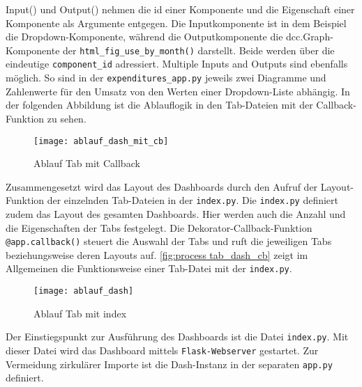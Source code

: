     Input() und Output() nehmen die id einer Komponente und die Eigenschaft einer Komponente als Argumente entgegen.
    Die Inputkomponente ist in dem Beispiel die Dropdown-Komponente, während die Outputkomponente die dcc.Graph-Komponente der
    \texttt{html\_fig\_use\_by\_month()} darstellt. Beide werden über die eindeutige \texttt{component\_id} adressiert.
    Multiple Inputs and Outputs sind ebenfalls möglich. So sind in der \texttt{expenditures\_app.py}
    jeweils zwei Diagramme und Zahlenwerte für den Umsatz von den Werten einer Dropdown-Liste abhängig.
    In der folgenden Abbildung ist die Ablauflogik in den Tab-Dateien mit der Callback-Funktion zu sehen.

    \begin{figure}[H]
        \centering
            \texttt{[image: ablauf\_dash\_mit\_cb]}
            \caption{Ablauf Tab mit Callback}
            \label{fig:process tab_dash_cb}
    \end{figure}


    Zusammengesetzt wird das Layout des Dashboards durch den Aufruf der Layout-Funktion der einzelnden Tab-Dateien in der \texttt{index.py}.
    Die \texttt{index.py} definiert zudem das Layout des gesamten Dashboards. Hier werden auch die Anzahl und die Eigenschaften der Tabs festgelegt. 
    Die Dekorator-Callback-Funktion \texttt{@app.callback()} steuert die Auswahl der Tabs und ruft die jeweiligen Tabs beziehungsweise deren 
    Layouts auf. \autoref{fig:process tab_dash_cb} zeigt im Allgemeinen die Funktionsweise einer Tab-Datei mit der \texttt{index.py}.

    \begin{figure}[H]
        \centering
            \texttt{[image: ablauf\_dash]}
            \caption{Ablauf Tab mit index}
            \label{fig:process tab_dash_cb}
    \end{figure}

    Der Einstiegspunkt zur Ausführung des Dashboards ist die Datei \texttt{index.py}. Mit dieser Datei wird das Dashboard mittels \texttt{Flask-Webserver}
    gestartet. Zur Vermeidung zirkulärer Importe ist die Dash-Instanz in der separaten \texttt{app.py} definiert\cite[vgl.][]{plotly_url_2021}.


